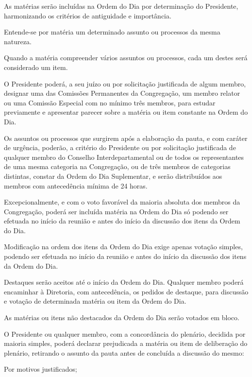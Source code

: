 \documentclass{documento}
\begin{document}

\artigo As matérias serão incluídas na Ordem do Dia por determinação do Presidente, harmonizando os critérios de antiguidade e importância.

\paragrafo Entende-se por matéria um determinado assunto ou processos da mesma natureza.

\paragrafo Quando a matéria compreender vários assuntos ou processos, cada um destes será considerado um item.

\paragrafo O Presidente poderá, a seu juízo ou por solicitação justificada de algum membro, designar uma das Comissões Permanentes da Congregação, um membro relator ou uma Comissão Especial com no mínimo três membros, para estudar previamente e apresentar parecer sobre a matéria ou item constante na Ordem do Dia.

\artigo Os assuntos ou processos que surgirem após a elaboração da pauta, e com caráter de urgência, poderão, a critério do Presidente ou por solicitação justificada de qualquer membro do Conselho Interdepartamental ou de todos os representantes de uma mesma categoria na Congregação, ou de três membros de categorias distintas, constar da Ordem do Dia Suplementar, e serão distribuídos aos membros com antecedência mínima de 24 horas.

\paragrafo Excepcionalmente, e com o voto favorável da maioria absoluta dos membros da Congregação, poderá ser incluída matéria na Ordem do Dia só podendo ser efetuada no início da reunião e antes do início da discussão dos itens da Ordem do Dia.

\paragrafo Modificação na ordem dos itens da Ordem do Dia exige apenas votação simples, podendo ser efetuada no início da reunião e antes do início da discussão dos itens da Ordem do Dia.

\artigo Destaques serão aceitos até o início da Ordem do Dia. Qualquer membro poderá encaminhar à Diretoria, com antecedência, os pedidos de destaque, para discussão e votação de determinada matéria ou item da Ordem do Dia.

\paragrafounico As matérias ou itens não destacados da Ordem do Dia serão votados em bloco.

\artigo O Presidente ou qualquer membro, com a concordância do plenário, decidida por maioria simples, poderá declarar prejudicada a matéria ou item de deliberação do plenário, retirando o assunto da pauta antes de concluída a discussão do mesmo:

\inciso Por motivos justificados;
\end{document}
